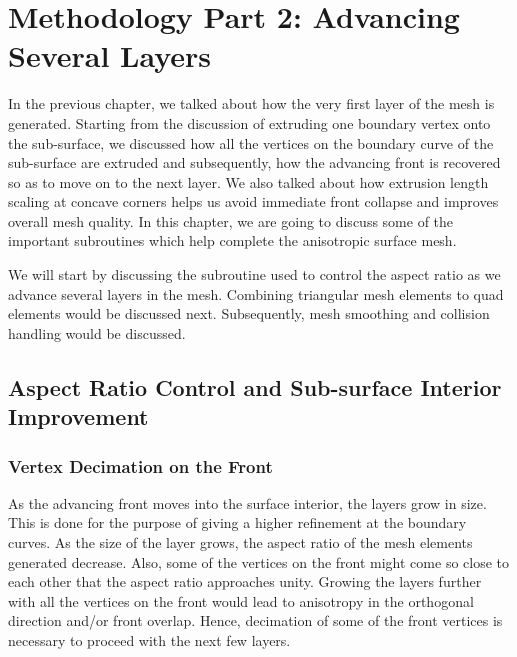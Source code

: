 \chapter{Methodology Part 2: Advancing Several Layers}

In the previous chapter, we talked about how the very first layer of the mesh is generated. Starting from the discussion of extruding one boundary vertex onto the sub-surface, we discussed how all the vertices on the boundary curve of the sub-surface are extruded and subsequently, how the advancing front is recovered so as to move on to the next layer. We also talked about how extrusion length scaling at concave corners helps us avoid immediate front collapse and improves overall mesh quality. In this chapter, we are going to discuss some of the important subroutines which help complete the anisotropic surface mesh.

We will start by discussing the subroutine used to control the aspect ratio as we advance several layers in the mesh. Combining triangular mesh elements to quad elements would be discussed next. Subsequently, mesh smoothing and collision handling would be discussed.

\section{Aspect Ratio Control and Sub-surface Interior Improvement}

\subsection{Vertex Decimation on the Front}
\label{aspectRatioControl}

As the advancing front moves into the surface interior, the layers grow in size. This is done for the purpose of giving a higher refinement at the boundary curves. As the size of the layer grows, the aspect ratio of the mesh elements generated decrease. Also, some of the vertices on the front might come so close to each other that the aspect ratio approaches unity. Growing the layers further with all the vertices on the front would lead to anisotropy in the orthogonal direction  and/or front overlap. Hence, decimation of some of the front vertices is necessary to proceed with the next few layers.

